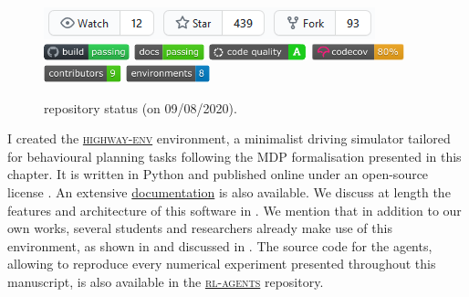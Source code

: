 \begin{figure}[ht]
	\centering
	\includegraphics[width=0.6\linewidth]{img/he-git}\\
	\includegraphics[height=0.5cm]{img/he-buil.pdf}
	\includegraphics[height=0.5cm]{img/he-docs.pdf}
	\includegraphics[height=0.5cm]{img/he-qual.pdf}
	\includegraphics[height=0.5cm]{img/he-cov.pdf}
	\includegraphics[height=0.5cm]{img/he-contr.pdf}
	\includegraphics[height=0.5cm]{img/he-envs.pdf}
	\caption{\highwayenv repository status (on 09/08/2020).}
	\label{fig:highway-env-status}
\end{figure}

I created the \href{https://github.com/eleurent/highway-env}{\textsc{highway-env}} environment, a minimalist driving simulator tailored for behavioural planning tasks following the \gls{MDP} formalisation presented in this chapter. It is written in Python and published online under an open-source license \citep{highway-env}. An extensive \href{https://highway-env.readthedocs.io/en/latest/}{documentation} is also available. We discuss at length the features and architecture of this software in . We mention that in addition to our own works, several students and researchers already make use of this environment, as shown in  and discussed in . The source code for the agents, allowing to reproduce every numerical experiment presented throughout this manuscript, is also available in the \href{https://github.com/eleurent/rl-agents}{\textsc{rl-agents}} repository.